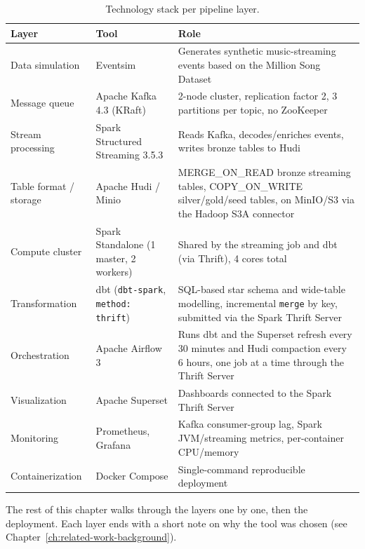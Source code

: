 \begin{table}[!htbp]
    \centering
    \small
    \begin{tabulary}{\textwidth}{|p{3.5cm}|p{4cm}|L|}
        \hline
        \textbf{Layer} & \textbf{Tool} & \textbf{Role} \\
        \hline
        Data simulation & Eventsim & Generates synthetic music-streaming events based on the Million Song Dataset \\
        \hline
        Message queue & Apache Kafka 4.3 (KRaft) & 2-node cluster, replication factor 2, 3 partitions per topic, no ZooKeeper \\
        \hline
        Stream processing & Spark Structured Streaming 3.5.3 & Reads Kafka, decodes/enriches events, writes bronze tables to Hudi \\
        \hline
        Table format / storage & Apache Hudi / Minio & MERGE\_ON\_READ bronze streaming tables, COPY\_ON\_WRITE silver/gold/seed tables, on MinIO/S3 via the Hadoop S3A connector \\
        \hline
        Compute cluster & Spark Standalone (1 master, 2 workers) & Shared by the streaming job and dbt (via Thrift), 4 cores total \\
        \hline
        Transformation & dbt (\texttt{dbt-spark}, \texttt{method: thrift}) & SQL-based star schema and wide-table modelling, incremental \texttt{merge} by key, submitted via the Spark Thrift Server \\
        \hline
        Orchestration & Apache Airflow 3 & Runs dbt and the Superset refresh every 30 minutes and Hudi compaction every 6 hours, one job at a time through the Thrift Server \\
        \hline
        Visualization & Apache Superset & Dashboards connected to the Spark Thrift Server \\
        \hline
        Monitoring & Prometheus, Grafana & Kafka consumer-group lag, Spark JVM/streaming metrics, per-container CPU/memory \\
        \hline
        Containerization & Docker Compose & Single-command reproducible deployment \\
        \hline
    \end{tabulary}
    \caption{Technology stack per pipeline layer.}
\end{table}

The rest of this chapter walks through the layers one by one, then the deployment. Each layer ends with a short note on why the tool was chosen (see Chapter~\ref{ch:related-work-background}).


